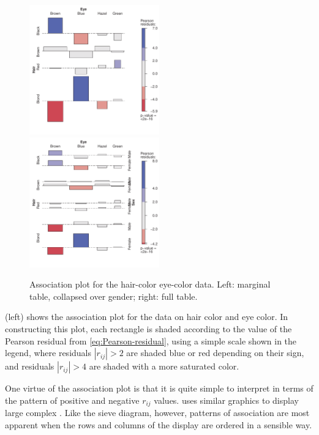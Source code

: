 \documentclass[10pt,krantz2]{krantz}\usepackage[]{graphicx}\usepackage[]{color}
\newenvironment{knitrout}{}{} %
\renewenvironment{knitrout}{\small\renewcommand{\baselinestretch}{.85}}{} %
\begin{document}
\begin{knitrout}
\color{fgcolor}\begin{figure}[!htbp]

\centerline{\includegraphics[width=0.5\textwidth]{ch04/fig/HE-assoc-1} 
\includegraphics[width=0.5\textwidth]{ch04/fig/HE-assoc-2} }

\caption[Association plot for the hair-color eye-color data]{Association plot for the hair-color eye-color data. Left: marginal table, collapsed over gender; right: full table.}\label{fig:HE-assoc}
\end{figure}


\end{knitrout}
 (left) shows the association plot for the data on
hair color and eye color.
In constructing this plot, each rectangle is shaded according to
the value of the Pearson residual from \eqref{eq:Pearson-residual},
using a simple scale shown in the legend, where residuals
$|r_{ij}| > 2$ are shaded blue or red depending on their sign,
and residuals $|r_{ij}| > 4$
are shaded with a more saturated color.

One virtue of the association plot is that it is quite simple to
interpret in terms of the pattern of
positive and negative  $r_{ij}$ values.
\citet{Bertin:81} uses similar graphics to display large complex
\ctabs.  Like the sieve diagram, however, patterns of association
are most apparent when the rows and columns of the display are ordered
in a sensible way.
\end{document}
